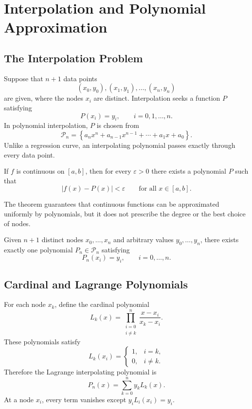 \chapter{Interpolation and Polynomial Approximation}

\section{The Interpolation Problem}

Suppose that $n+1$ data points
\[
 (x_0,y_0),(x_1,y_1),\ldots,(x_n,y_n)
\]
are given, where the nodes $x_i$ are distinct.  Interpolation seeks a function $P$ satisfying
\[
 P(x_i)=y_i,
 \qquad i=0,1,\ldots,n.
\]
In polynomial interpolation, $P$ is chosen from
\[
 \mathcal P_n
 =\left\{a_nx^n+a_{n-1}x^{n-1}+\cdots+a_1x+a_0\right\}.
\]
Unlike a regression curve, an interpolating polynomial passes exactly through every data point.

\begin{theorem}
If $f$ is continuous on $[a,b]$, then for every $\varepsilon>0$ there exists a polynomial $P$ such that
\[
 |f(x)-P(x)|<\varepsilon
 \qquad\text{for all }x\in[a,b].
\]
\end{theorem}

The theorem guarantees that continuous functions can be approximated uniformly by polynomials, but it does not prescribe the degree or the best choice of nodes.

\begin{theorem}
Given $n+1$ distinct nodes $x_0,\ldots,x_n$ and arbitrary values $y_0,\ldots,y_n$, there exists exactly one polynomial $P_n\in\mathcal P_n$ satisfying
\[
 P_n(x_i)=y_i,
 \qquad i=0,\ldots,n.
\]
\end{theorem}

\section{Cardinal and Lagrange Polynomials}

For each node $x_k$, define the cardinal polynomial
\[
 L_k(x)=\prod_{\substack{i=0\\i\ne k}}^n
 \frac{x-x_i}{x_k-x_i}.
\]
These polynomials satisfy
\[
 L_k(x_i)=
 \begin{cases}
 1,&i=k,\\
 0,&i\ne k.
 \end{cases}
\]
Therefore the Lagrange interpolating polynomial is
\[
 P_n(x)=\sum_{k=0}^n y_kL_k(x).
\]
At a node $x_i$, every term vanishes except $y_iL_i(x_i)=y_i$.

